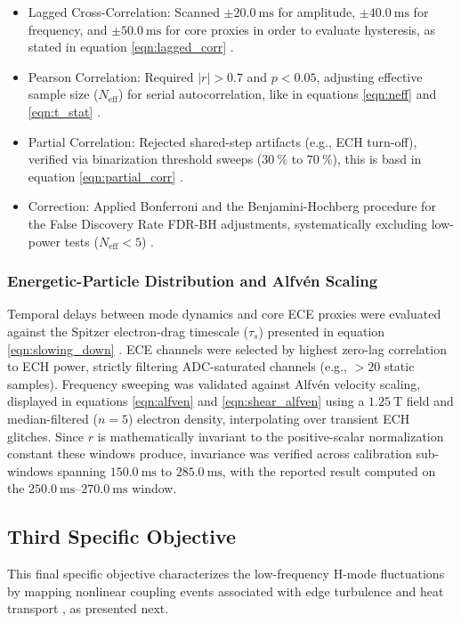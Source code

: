 \begin{itemize}
    \item Lagged Cross-Correlation: Scanned $\pm 20.0~\mathrm{ms}$ for amplitude, $\pm 40.0~\mathrm{ms}$ for frequency, and $\pm 50.0~\mathrm{ms}$ for core proxies in order to evaluate hysteresis, as stated in equation \ref{eqn:lagged_corr} \cite{Zhong2020}.
    \item Pearson Correlation: Required $|r| > 0.7$ and $p < 0.05$, adjusting effective sample size ($N_{\mathrm{eff}}$) for serial autocorrelation, like in equations  \ref{eqn:neff} and \ref{eqn:t_stat} \cite{shumway2017time}.
    \item Partial Correlation: Rejected shared-step artifacts (e.g., ECH turn-off), verified via binarization threshold sweeps ($30~\%$ to $70~\%$), this is basd in equation   \ref{eqn:partial_corr} \cite{james2021statistical}.
    \item Correction: Applied Bonferroni and the Benjamini-Hochberg procedure for the False Discovery Rate FDR-BH adjustments, systematically excluding low-power tests ($N_{\mathrm{eff}} < 5$) \cite{dunn1961multiple, Benjamini1995}.

\end{itemize}




\subsubsection{Energetic-Particle Distribution and Alfvén Scaling}
Temporal delays between mode dynamics and core ECE proxies were evaluated against the Spitzer electron-drag timescale ($\tau_s$) presented in equation \ref{eqn:slowing_down} \cite{Salewski2025}. ECE channels were selected by highest zero-lag correlation to ECH power, strictly filtering ADC-saturated channels (e.g., $> 20$ static samples).
Frequency sweeping was validated against Alfvén velocity scaling, displayed in equations \ref{eqn:alfven} and \ref{eqn:shear_alfven} \cite{chen2016introduction, Varela2024} using a $1.25~\mathrm{T}$ field and median-filtered ($n=5$) electron density, interpolating over transient ECH glitches. Since $r$ is mathematically invariant to the positive-scalar normalization constant these windows produce, invariance was verified across calibration sub-windows spanning $150.0~\mathrm{ms}$ to $285.0~\mathrm{ms}$, with the reported result computed on the $250.0~\mathrm{ms}$--$270.0~\mathrm{ms}$ window.

\subsection{Third Specific Objective}
This final specific objective characterizes the low-frequency H-mode fluctuations by mapping nonlinear coupling events associated with edge turbulence and heat transport \cite{Kin2025, Miyashita2025}, as presented next.

